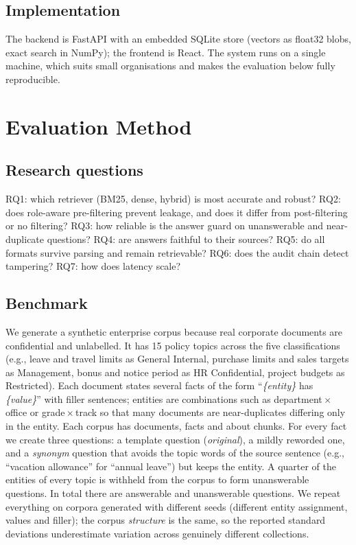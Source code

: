 \documentclass[journal]{IEEEtran}
\begin{document}
\subsection{Implementation}
The backend is FastAPI with an embedded SQLite store (vectors as float32 blobs, exact search in NumPy); the frontend is React. The system runs on a single machine, which suits small organisations and makes the evaluation below fully reproducible.

\section{Evaluation Method}\label{sec:eval}
\subsection{Research questions}
RQ1: which retriever (BM25, dense, hybrid) is most accurate and robust? RQ2: does role-aware pre-filtering prevent leakage, and does it differ from post-filtering or no filtering? RQ3: how reliable is the answer guard on unanswerable and near-duplicate questions? RQ4: are answers faithful to their sources? RQ5: do all formats survive parsing and remain retrievable? RQ6: does the audit chain detect tampering? RQ7: how does latency scale?

\subsection{Benchmark}
We generate a synthetic enterprise corpus because real corporate documents are confidential and unlabelled. It has 15 policy topics across the five classifications (e.g., leave and travel limits as General Internal, purchase limits and sales targets as Management, bonus and notice period as HR Confidential, project budgets as Restricted). Each document states several facts of the form ``\emph{\{entity\}} has \emph{\{value\}}'' with filler sentences; entities are combinations such as department\,$\times$\,office or grade\,$\times$\,track so that many documents are near-duplicates differing only in the entity. Each corpus has \NDocs{} documents, \NFacts{} facts and about \NChunks{} chunks. For every fact we create three questions: a template question (\emph{original}), a mildly reworded one, and a \emph{synonym} question that avoids the topic words of the source sentence (e.g., ``vacation allowance'' for ``annual leave'') but keeps the entity. A quarter of the entities of every topic is withheld from the corpus to form unanswerable questions. In total there are \NAnswerable{} answerable and \NUnanswerable{} unanswerable questions. We repeat everything on \NSeeds{} corpora generated with different seeds (different entity assignment, values and filler); the corpus \emph{structure} is the same, so the reported standard deviations underestimate variation across genuinely different collections.
\end{document}
